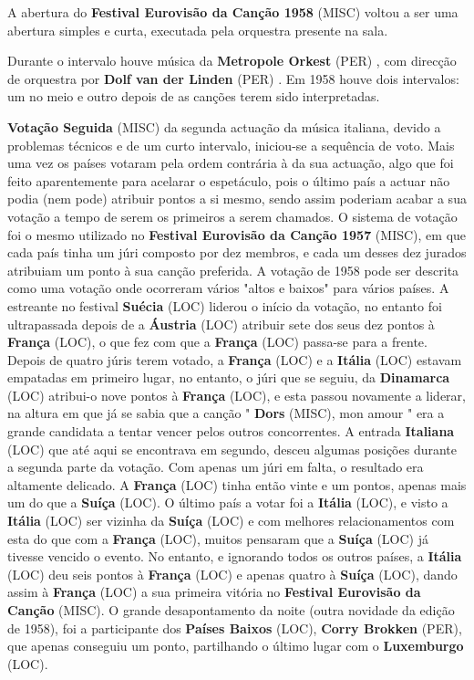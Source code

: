 \documentclass[12pt,a4paper]{article}
\begin{document}
A abertura do \textbf{Festival Eurovisão da Canção 1958} (MISC) voltou a ser uma abertura simples e curta, executada pela orquestra presente na sala.

Durante o intervalo houve música da \textbf{Metropole Orkest} (PER) , com direcção de orquestra por \textbf{Dolf van der Linden} (PER) . Em 1958 houve dois intervalos: um no meio e outro depois de as canções terem sido interpretadas.



\textbf{Votação Seguida} (MISC) da segunda actuação da música italiana, devido a problemas técnicos e de um curto intervalo, iniciou-se a sequência de voto. Mais uma vez os países votaram pela ordem contrária à da sua actuação, algo que foi feito aparentemente para acelarar o espetáculo, pois o último país a actuar não podia (nem pode) atribuir pontos a si mesmo, sendo assim poderiam acabar a sua votação a tempo de serem os primeiros a serem chamados. O sistema de votação foi o mesmo utilizado no \textbf{Festival Eurovisão da Canção 1957} (MISC), em que cada país tinha um júri composto por dez membros, e cada um desses dez jurados atribuiam um ponto à sua canção preferida. A votação de 1958 pode ser descrita como uma votação onde ocorreram vários "altos e baixos" para vários países. A estreante no festival \textbf{Suécia} (LOC) liderou o início da votação, no entanto foi ultrapassada depois de a \textbf{Áustria} (LOC) atribuir sete dos seus dez pontos à \textbf{França} (LOC), o que fez com que a \textbf{França} (LOC) passa-se para a frente. Depois de quatro júris terem votado, a \textbf{França} (LOC) e a \textbf{Itália} (LOC) estavam empatadas em primeiro lugar, no entanto, o júri que se seguiu, da \textbf{Dinamarca} (LOC) atribui-o nove pontos à \textbf{França} (LOC), e esta passou novamente a liderar, na altura em que já se sabia que a canção " \textbf{Dors} (MISC), mon amour " era a grande candidata a tentar vencer pelos outros concorrentes. A entrada \textbf{Italiana} (LOC) que até aqui se encontrava em segundo, desceu algumas posições durante a segunda parte da votação. Com apenas um júri em falta, o resultado era altamente delicado. A \textbf{França} (LOC) tinha então vinte e um pontos, apenas mais um do que a \textbf{Suíça} (LOC). O último país a votar foi a \textbf{Itália} (LOC), e visto a \textbf{Itália} (LOC) ser vizinha da \textbf{Suíça} (LOC) e com melhores relacionamentos com esta do que com a \textbf{França} (LOC), muitos pensaram que a \textbf{Suíça} (LOC) já tivesse vencido o evento. No entanto, e ignorando todos os outros países, a \textbf{Itália} (LOC) deu seis pontos à \textbf{França} (LOC) e apenas quatro à \textbf{Suíça} (LOC), dando assim à \textbf{França} (LOC) a sua primeira vitória no \textbf{Festival Eurovisão da Canção} (MISC). O grande desapontamento da noite (outra novidade da edição de 1958), foi a participante dos \textbf{Países Baixos} (LOC), \textbf{Corry Brokken} (PER), que apenas conseguiu um ponto, partilhando o último lugar com o \textbf{Luxemburgo} (LOC).
\end{document}
